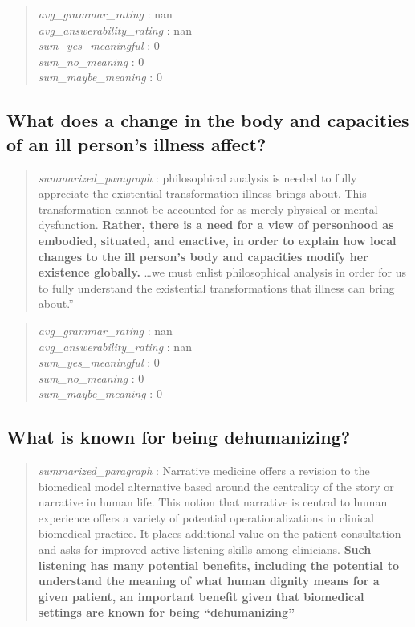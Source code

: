 \begin{quote}
\emph{avg\_grammar\_rating} : nan\\
\emph{avg\_answerability\_rating} : nan\\
\emph{sum\_yes\_meaningful} : 0\\
\emph{sum\_no\_meaning} : 0\\
\emph{sum\_maybe\_meaning} : 0
\end{quote}

\hypertarget{what-does-a-change-in-the-body-and-capacities-of-an-ill-persons-illness-affect}{%
\subsection{What does a change in the body and capacities of an ill
person's illness
affect?}\label{what-does-a-change-in-the-body-and-capacities-of-an-ill-persons-illness-affect}}

\begin{quote}
\emph{summarized\_paragraph} : philosophical analysis is needed to fully
appreciate the existential transformation illness brings about. This
transformation cannot be accounted for as merely physical or mental
dysfunction. \textbf{Rather, there is a need for a view of personhood as
embodied, situated, and enactive, in order to explain how local changes
to the ill person's body and capacities modify her existence globally.}
\ldots we must enlist philosophical analysis in order for us to fully
understand the existential transformations that illness can bring
about.''
\end{quote}

\begin{quote}
\emph{avg\_grammar\_rating} : nan\\
\emph{avg\_answerability\_rating} : nan\\
\emph{sum\_yes\_meaningful} : 0\\
\emph{sum\_no\_meaning} : 0\\
\emph{sum\_maybe\_meaning} : 0
\end{quote}

\hypertarget{what-is-known-for-being-dehumanizing}{%
\subsection{What is known for being
dehumanizing?}\label{what-is-known-for-being-dehumanizing}}

\begin{quote}
\emph{summarized\_paragraph} : Narrative medicine offers a revision to
the biomedical model alternative based around the centrality of the
story or narrative in human life. This notion that narrative is central
to human experience offers a variety of potential operationalizations in
clinical biomedical practice. It places additional value on the patient
consultation and asks for improved active listening skills among
clinicians. \textbf{Such listening has many potential benefits,
including the potential to understand the meaning of what human dignity
means for a given patient, an important benefit given that biomedical
settings are known for being ``dehumanizing''}
\end{quote}

